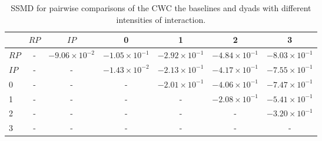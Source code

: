 \begin{table}
\centering
\caption{SSMD for pairwise comparisons of the CWC the baselines and dyads with different intensities of interaction.}
\label{tab:ssmd_coherence}
\begin{tabular}{lcccccc}
\toprule
 & $RP$ & $IP$ & 0 & 1 & 2 & 3 \\
\midrule
$RP$ & - & $-9.06 \times 10^{-2}$ & $-1.05 \times 10^{-1}$ & $-2.92 \times 10^{-1}$ & $-4.84 \times 10^{-1}$ & $-8.03 \times 10^{-1}$ \\
$IP$ & - & - & $-1.43 \times 10^{-2}$ & $-2.13 \times 10^{-1}$ & $-4.17 \times 10^{-1}$ & $-7.55 \times 10^{-1}$ \\
0 & - & - & - & $-2.01 \times 10^{-1}$ & $-4.06 \times 10^{-1}$ & $-7.47 \times 10^{-1}$ \\
1 & - & - & - & - & $-2.08 \times 10^{-1}$ & $-5.41 \times 10^{-1}$ \\
2 & - & - & - & - & - & $-3.20 \times 10^{-1}$ \\
3 & - & - & - & - & - & - \\
\bottomrule
\end{tabular}
\end{table}
